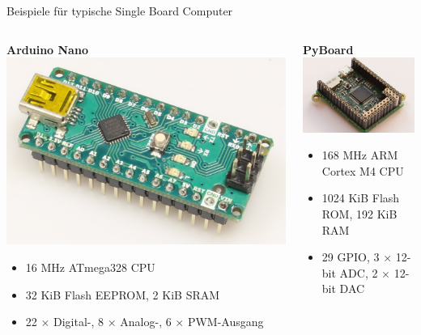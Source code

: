 
{
\scriptsize

\begin{frame}{Beispiele für typische Single Board Computer}
    \begin{columns}
        \begin{column}[b]{.5\textwidth}
            \textbf{Arduino Nano} \\
            \smallskip
            \includegraphics[width=.5\textwidth]{img/sbc-arduino_nano}

            \begin{itemize}
                \setlength{\itemindent}{-1em}
                \setlength\itemsep{0em}
                \item 16 MHz ATmega328 CPU
                \item 32 KiB Flash EEPROM, 2 KiB SRAM
                \item 22 $\times$ Digital-, 8 $\times$ Analog-, 6 $\times$ PWM-Ausgang
            \end{itemize}
        \end{column}

        \begin{column}[b]{.5\textwidth}
            \textbf{PyBoard} \\
            \smallskip
            \includegraphics[width=.5\textwidth]{img/sbc-pyboard}

            \begin{itemize}
                \setlength{\itemindent}{-1em}
                \setlength\itemsep{0em}
                \item 168 MHz ARM Cortex M4 CPU
                \item 1024 KiB Flash ROM, 192 KiB RAM
                \item 29 GPIO, 3 $\times$ 12-bit ADC, 2 $\times$ 12-bit DAC
            \end{itemize}
        \end{column}
    \end{columns}


\end{frame}}

